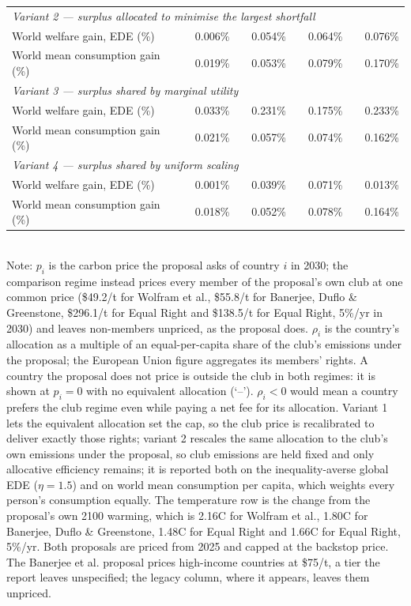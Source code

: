 \begin{table}[htbp]
\begin{tabular}{lcccccccc}
  \midrule
  \multicolumn{9}{l}{\textit{Variant 2 --- surplus allocated to minimise the largest shortfall}} \\
  \quad World welfare gain, EDE (\%) &  & 0.006\% &  & 0.054\% &  & 0.064\% &  & 0.076\% \\
  \quad World mean consumption gain (\%) &  & 0.019\% &  & 0.053\% &  & 0.079\% &  & 0.170\% \\
  \midrule
  \multicolumn{9}{l}{\textit{Variant 3 --- surplus shared by marginal utility}} \\
  \quad World welfare gain, EDE (\%) &  & 0.033\% &  & 0.231\% &  & 0.175\% &  & 0.233\% \\
  \quad World mean consumption gain (\%) &  & 0.021\% &  & 0.057\% &  & 0.074\% &  & 0.162\% \\
  \midrule
  \multicolumn{9}{l}{\textit{Variant 4 --- surplus shared by uniform scaling}} \\
  \quad World welfare gain, EDE (\%) &  & 0.001\% &  & 0.039\% &  & 0.071\% &  & 0.013\% \\
  \quad World mean consumption gain (\%) &  & 0.018\% &  & 0.052\% &  & 0.078\% &  & 0.164\% \\
  \bottomrule
\end{tabular}
\label{tab:equiv_rights_B}
\\[4pt]
{\footnotesize Note: $p_i$ is the carbon price the proposal asks of country $i$ in 2030; the comparison regime instead prices every member of the proposal's own club at one common price (\$49.2/t for Wolfram et al., \$55.8/t for Banerjee, Duflo \& Greenstone, \$296.1/t for Equal Right and \$138.5/t for Equal Right, 5\%/yr in 2030) and leaves non-members unpriced, as the proposal does. $\rho_i$ is the country's allocation as a multiple of an equal-per-capita share of the club's emissions under the proposal; the European Union figure aggregates its members' rights. A country the proposal does not price is outside the club in both regimes: it is shown at $p_i=0$ with no equivalent allocation (`--'). $\rho_i < 0$ would mean a country prefers the club regime even while paying a net fee for its allocation. Variant 1 lets the equivalent allocation set the cap, so the club price is recalibrated to deliver exactly those rights; variant 2 rescales the same allocation to the club's own emissions under the proposal, so club emissions are held fixed and only allocative efficiency remains; it is reported both on the inequality-averse global EDE ($\eta=1.5$) and on world mean consumption per capita, which weights every person's consumption equally. The temperature row is the change from the proposal's own 2100 warming, which is 2.16\textdegree{}C for Wolfram et al., 1.80\textdegree{}C for Banerjee, Duflo \& Greenstone, 1.48\textdegree{}C for Equal Right and 1.66\textdegree{}C for Equal Right, 5\%/yr. Both proposals are priced from 2025 and capped at the backstop price. The Banerjee et al. proposal prices high-income countries at \$75/t, a tier the report leaves unspecified; the legacy column, where it appears, leaves them unpriced.}
\end{table}
